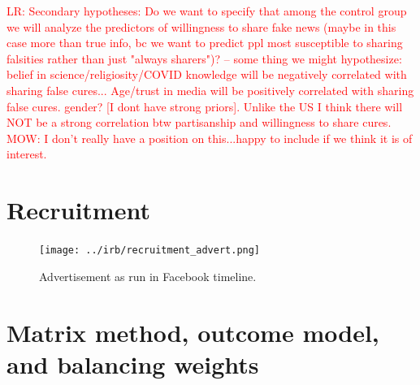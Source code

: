 \documentclass[letterpaper, 12pt, parskip=full,]{scrartcl}
\begin{document}
\textcolor{red}{LR: Secondary hypotheses: Do we want to specify that among the control group we will analyze the predictors of willingness to share fake news (maybe in this case more than true info, bc we want to predict ppl most susceptible to sharing falsities rather than just "always sharers")? -- some thing we might hypothesize: belief in science/religiosity/COVID knowledge will be negatively correlated with sharing false cures... Age/trust in media will be positively correlated with sharing false cures. gender? [I dont have strong priors]. Unlike the US I think there will NOT be a strong correlation btw partisanship and willingness to share cures.\\
MOW: I don't really have a position on this...happy to include if we think it is of interest.}





\clearpage



\clearpage
\appendix

\section{Recruitment}\label{recruitment}

\begin{figure}[htb]
\centering
\caption{Advertisement as run in Facebook timeline.}
\label{fig:ad}
\texttt{[image: ../irb/recruitment\_advert.png]}
\end{figure}


\section{Matrix method, outcome model, and balancing weights}
\end{document}
